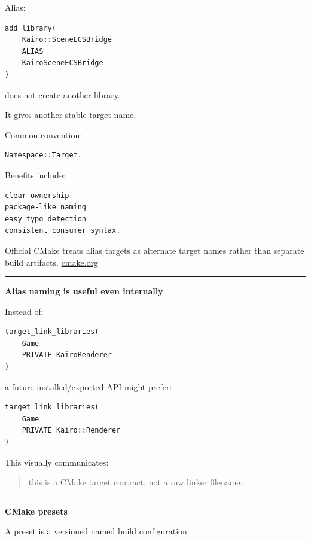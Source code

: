 Alias:

\begin{verbatim}
add_library(
    Kairo::SceneECSBridge
    ALIAS
    KairoSceneECSBridge
)
\end{verbatim}

does not create another library.

It gives another stable target name.

Common convention:

\begin{verbatim}
Namespace::Target.
\end{verbatim}

Benefits include:

\begin{verbatim}
clear ownership
package-like naming
easy typo detection
consistent consumer syntax.
\end{verbatim}

Official CMake treats alias targets as alternate target names rather than separate build artifacts. \href{https://cmake.org/cmake/help/latest/command/add_library.html?utm_source=chatgpt.com}{cmake.org}

\begin{center}\rule{0.5\linewidth}{0.5pt}\end{center}

\textbf{Alias naming is useful even internally}

Instead of:

\begin{verbatim}
target_link_libraries(
    Game
    PRIVATE KairoRenderer
)
\end{verbatim}

a future installed/exported API might prefer:

\begin{verbatim}
target_link_libraries(
    Game
    PRIVATE Kairo::Renderer
)
\end{verbatim}

This visually communicates:

\begin{quote}
this is a CMake target contract, not a raw linker filename.
\end{quote}

\begin{center}\rule{0.5\linewidth}{0.5pt}\end{center}

\textbf{CMake presets}

A preset is a versioned named build configuration.

